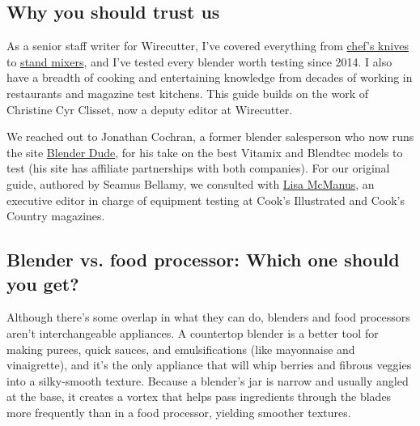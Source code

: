 \hypertarget{why-you-should-trust-us}{%
\subsection{Why you should trust us}\label{why-you-should-trust-us}}

As a senior staff writer for Wirecutter, I've covered everything from
\href{https://www.nytimes3xbfgragh.onion/wirecutter/reviews/the-best-chefs-knife-for-most-cooks/}{chef's
knives} to
\href{https://www.nytimes3xbfgragh.onion/wirecutter/reviews/best-stand-mixer/}{stand
mixers}, and I've tested every blender worth testing since 2014. I also
have a breadth of cooking and entertaining knowledge from decades of
working in restaurants and magazine test kitchens. This guide builds on
the work of Christine Cyr Clisset, now a deputy editor at Wirecutter.

We reached out to Jonathan Cochran, a former blender salesperson who now
runs the site \href{http://blenderdude.com/}{Blender Dude}, for his take
on the best Vitamix and Blendtec models to test (his site has affiliate
partnerships with both companies). For our original guide, authored by
Seamus Bellamy, we consulted with
\href{http://www.americastestkitchen.com/tour}{Lisa McManus}, an
executive editor in charge of equipment testing at Cook's Illustrated
and Cook's Country magazines.

\hypertarget{blender-vs-food-processor-which-one-should-you-get}{%
\subsection{Blender vs. food processor: Which one should you
get?}\label{blender-vs-food-processor-which-one-should-you-get}}

Although there's some overlap in what they can do, blenders and food
processors aren't interchangeable appliances. A countertop blender is a
better tool for making purees, quick sauces, and emulsifications (like
mayonnaise and vinaigrette), and it's the only appliance that will whip
berries and fibrous veggies into a silky-smooth texture. Because a
blender's jar is narrow and usually angled at the base, it creates a
vortex that helps pass ingredients through the blades more frequently
than in a food processor, yielding smoother textures.

